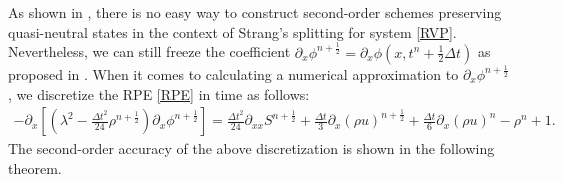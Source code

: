 \documentclass[letterpaper,10pt]{article}
\numberwithin{equation}{section}
\numberwithin{figure}{section}
\numberwithin{table}{section}
\begin{document}
As shown in \cite{Crou2016}, there is no easy way to construct second-order schemes preserving quasi-neutral states in the context of Strang's splitting for system \eqref{RVP}. Nevertheless, we can still freeze the coefficient $\partial_x\phi^{n+\frac{1}{2}}=\partial_x\phi\left(x,t^n+\frac{1}{2}\Delta t\right)$ as proposed in \cite{CHENG1976330}. When it comes to calculating a numerical approximation to $\partial_x\phi^{n+\frac{1}{2}}$, we discretize the RPE \eqref{RPE} in time as follows:
\begin{align}\label{RPEdis2nd} 
    -\partial_x\left[\left(\lambda^2-\frac{\Delta t^2}{24} \rho^{n+\frac{1}{2}}\right) \partial_x \phi^{n+\frac{1}{2}}\right] =\frac{\Delta t^2}{24} \partial_{x x} S^{n+\frac{1}{2}}  +\frac{\Delta t}{3} \partial_x(\rho u)^{n+\frac{1}{2}}+\frac{\Delta t}{6} \partial_x(\rho u)^n-\rho^n+1 .
\end{align}
The second-order accuracy of the above discretization is shown in the following theorem.
\end{document}
